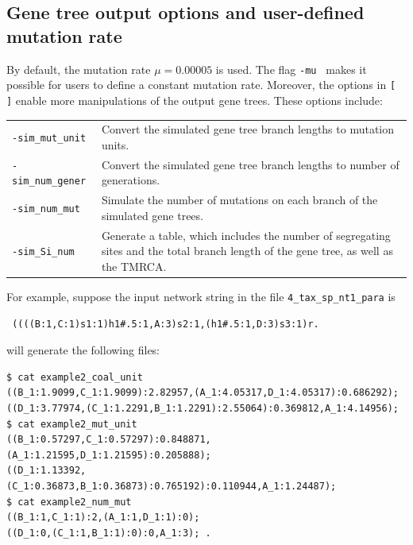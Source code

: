 \subsection{Gene tree output options and user-defined mutation rate}
By default, the mutation rate $\mu=0.00005$ is used. The flag {\tt -mu } makes it possible for users to define a constant mutation rate. Moreover, the options in {\tt [ ]} enable more manipulations of the output gene trees. These options include:
\begin{longtable}{lp{9cm}}
{\tt -sim\_mut\_unit }& Convert the simulated gene tree branch lengths to mutation units.\\
{\tt -sim\_num\_gener }& Convert the simulated gene tree branch lengths to number of generations.\\
{\tt -sim\_num\_mut }& Simulate the number of mutations on each branch of the simulated gene trees.\\
{\tt -sim\_Si\_num }&  Generate a table, which includes the number of segregating sites and the total branch length of the gene tree, as well as the TMRCA.\\
\end{longtable}

For example, suppose the input network string in the file {\tt 4\_tax\_sp\_nt1\_para} is %
\begin{verbatim}
 ((((B:1,C:1)s1:1)h1#.5:1,A:3)s2:1,(h1#.5:1,D:3)s3:1)r.
\end{verbatim}

will generate the following files:
\begin{verbatim}
$ cat example2_coal_unit
((B_1:1.9099,C_1:1.9099):2.82957,(A_1:4.05317,D_1:4.05317):0.686292);
((D_1:3.77974,(C_1:1.2291,B_1:1.2291):2.55064):0.369812,A_1:4.14956);
$ cat example2_mut_unit
((B_1:0.57297,C_1:0.57297):0.848871,(A_1:1.21595,D_1:1.21595):0.205888);
((D_1:1.13392,(C_1:0.36873,B_1:0.36873):0.765192):0.110944,A_1:1.24487);
$ cat example2_num_mut
((B_1:1,C_1:1):2,(A_1:1,D_1:1):0);
((D_1:0,(C_1:1,B_1:1):0):0,A_1:3); .
\end{verbatim}

